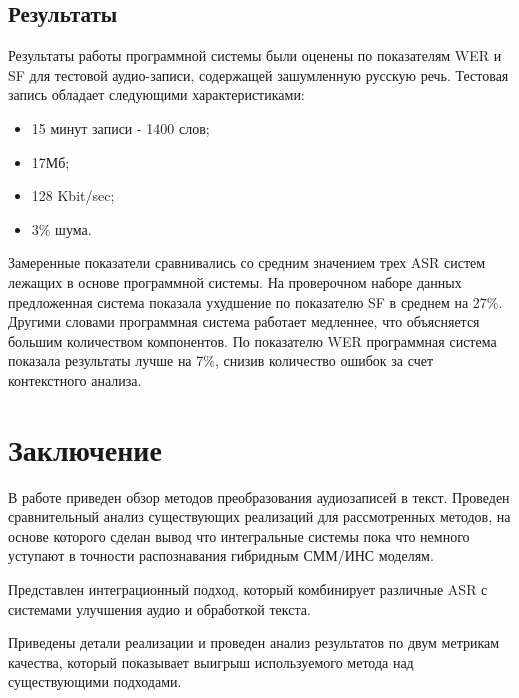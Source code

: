 \documentclass[conference]{IEEEtran}
\begin{document}
\subsection{Результаты}
Результаты работы программной системы были оценены по показателям WER и SF для тестовой аудио-записи, содержащей зашумленную русскую речь.
Тестовая запись обладает следующими характеристиками:

\begin{itemize}
\item 15 минут записи - 1400 слов;
\item 17Мб;
\item 128 Kbit/sec;
\item 3\% шума.
\end{itemize}

Замеренные показатели сравнивались со средним значением трех ASR систем лежащих в основе программной системы.
На проверочном наборе данных предложенная система показала ухудшение по показателю SF в среднем на 27\%.
Другими словами программная система работает медленнее, что объясняется большим количеством компонентов.
По показателю WER программная система показала результаты лучше на 7\%, снизив количество ошибок за счет контекстного анализа.

\section{Заключение}
В работе приведен обзор методов преобразования аудиозаписей в текст. Проведен сравнительный анализ существующих реализаций для рассмотренных методов, на основе которого сделан вывод что интегральные системы пока что немного уступают в точности распознавания гибридным СММ/ИНС моделям.

Представлен интеграционный подход, который комбинирует различные ASR с системами улучшения аудио и обработкой текста.

Приведены детали реализации и проведен анализ результатов по двум метрикам качества, который показывает выигрыш используемого метода над существующими подходами.
\end{document}
